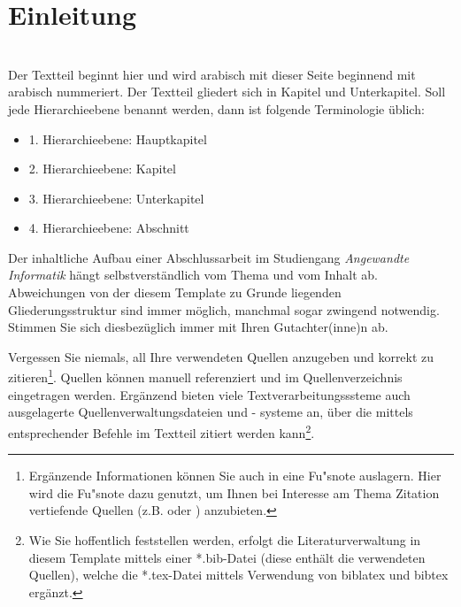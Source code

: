 \chapter{Einleitung}
\\
\linebreak[4]
\linebreak[4]
Der Textteil beginnt hier und wird arabisch mit dieser Seite beginnend mit \flqq{} arabisch nummeriert. Der Textteil gliedert sich in Kapitel und Unterkapitel. Soll jede Hierarchieebene benannt werden, dann ist folgende Terminologie  \"ublich:

\begin{itemize}
\item 1. Hierarchieebene: Hauptkapitel
\item 2. Hierarchieebene: Kapitel
\item 3. Hierarchieebene: Unterkapitel
\item 4. Hierarchieebene: Abschnitt
\end{itemize}

Der inhaltliche Aufbau einer Abschlussarbeit im Studiengang \textit{Angewandte Informatik} h\"angt selbstverst\"andlich vom Thema und vom Inhalt ab. Abweichungen von der diesem Template zu Grunde liegenden Gliederungsstruktur sind immer m\"oglich, manchmal sogar zwingend notwendig. Stimmen Sie sich diesbez\"uglich immer mit Ihren Gutachter(inne)n ab.


Vergessen Sie niemals, all Ihre verwendeten Quellen anzugeben und korrekt zu zitieren\footnote{Erg\"anzende Informationen k\"onnen Sie auch in eine Fu"snote auslagern. Hier wird die Fu"snote dazu genutzt, um Ihnen bei Interesse am Thema Zitation vertiefende Quellen (z.B. \autocite{balzert2011} oder \autocite{franck2013}) anzubieten.}. Quellen k\"onnen manuell referenziert und im Quellenverzeichnis eingetragen werden. Erg\"anzend bieten viele Textverarbeitungsssteme auch ausgelagerte Quellenverwaltungsdateien und - systeme an,  \"uber die mittels entsprechender Befehle im Textteil zitiert werden kann\footnote{Wie Sie hoffentlich feststellen werden, erfolgt die Literaturverwaltung in diesem Template mittels einer *.bib-Datei (diese enth\"alt die verwendeten Quellen), welche die *.tex-Datei mittels Verwendung von biblatex und bibtex erg\"anzt.}.

